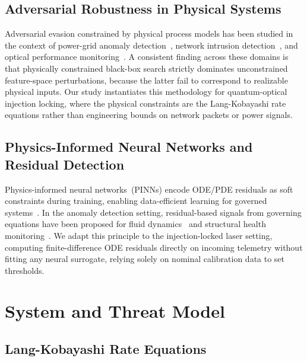 \documentclass[journal,twocolumn]{IEEEtran}
\begin{document}
\subsection{Adversarial Robustness in Physical Systems}

Adversarial evasion constrained by physical process models has been studied in the
context of power-grid anomaly detection~\cite{deng2017}, network intrusion
detection~\cite{papernot2016}, and optical performance monitoring~\cite{peng2023}.
A consistent finding across these domains is that physically constrained black-box
search strictly dominates unconstrained feature-space perturbations, because the
latter fail to correspond to realizable physical inputs. Our study instantiates this
methodology for quantum-optical injection locking, where the physical constraints are
the Lang-Kobayashi rate equations rather than engineering bounds on network packets
or power signals.

\subsection{Physics-Informed Neural Networks and Residual Detection}

Physics-informed neural networks~(PINNs) encode ODE/PDE residuals as soft constraints
during training, enabling data-efficient learning for governed
systems~\cite{raissi2019}. In the anomaly detection setting, residual-based signals
from governing equations have been proposed for fluid
dynamics~\cite{cai2021} and structural health monitoring~\cite{ritto2021}. We adapt
this principle to the injection-locked laser setting, computing
finite-difference ODE residuals directly on incoming telemetry without fitting any
neural surrogate, relying solely on nominal calibration data to set thresholds.

\section{System and Threat Model}
\label{sec:model}

\subsection{Lang-Kobayashi Rate Equations}
\end{document}
